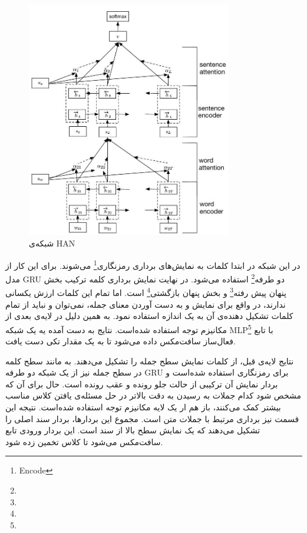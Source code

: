 \documentclass[12pt, a4paper, oneside]{report}
\begin{document}
\begin{figure}[!ht]
    \centering
    \includegraphics[width=0.8\textwidth]{HAN}
    \caption{شبکه‌ی HAN}
    \label{fig:HAN}
\end{figure}

در این شبکه در ابتدا کلمات به نمایش‌های برداری
رمزنگاری\footnote{Encode}
می‌شوند. برای این کار از مدل
GRU
دو طرفه\footnote{}
استفاده می‌شود. در نهایت نمایش برداری کلمه ترکیب 
بخش پنهان پیش رفته\footnote{}
و 
بخش پنهان بازگشتی\footnote{}
است. اما تمام این کلمات ارزش یکسانی ندارند، در واقع برای نمایش و به دست آوردن معنای جمله، نمی‌توان و نباید
از تمام کلمات تشکیل دهنده‌ی آن به یک اندازه استفاده نمود. به همین دلیل در لایه‌ی بعدی از مکانیزم توجه
استفاده شده‌است. نتایج به دست آمده یه یک شبکه
MLP\footnote{}
با تابع فعال‌ساز سافت‌مکس داده می‌شود تا به یک مقدار تکی دست یافت.

نتایج لایه‌ی قبل، از کلمات نمایش سطح  جمله را تشکیل می‌دهند.
به مانند سطح کلمه در سطح جمله نیز از یک شبکه دو طرفه
GRU
برای رمزنگاری استفاده شده‌است و بردار نمایش آن ترکیبی از حالت جلو رونده و عقب رونده است.
حال برای آن که مشخص شود کدام جملات به رسیدن به دقت بالاتر در حل مسئله‌ی یافتن
کلاس مناسب بیشتر کمک می‌کنند، باز هم ار یک لایه مکانیزم توجه استفاده شده‌است. نتیجه این
قسمت نیز برداری مرتبط با جملات متن است. مجموع این بردار‌ها، بردار سند اصلی را تشکیل می‌دهند
که یک نمایش سطح بالا از سند است. این بردار ورودی تابع سافت‌مکس می‌شود تا کلاس تخمین زده شود.
\end{document}
